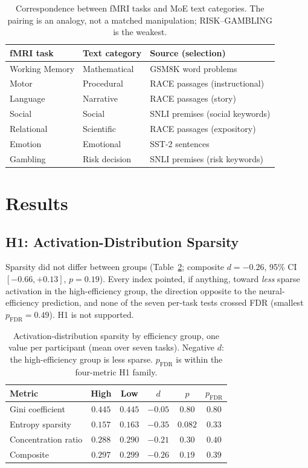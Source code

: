 \documentclass[conference]{IEEEtran}
\begin{document}
\begin{table}[t]
\caption{Correspondence between fMRI tasks and MoE text categories. The pairing is an analogy, not a matched manipulation; RISK--GAMBLING is the weakest.}
\label{tab:mapping}
\centering
\footnotesize
\setlength{\tabcolsep}{3pt}
\begin{tabular}{@{}lll@{}}
\toprule
\textbf{fMRI task} & \textbf{Text category} & \textbf{Source (selection)} \\
\midrule
Working Memory & Mathematical & GSM8K word problems \\
Motor & Procedural & RACE passages (instructional) \\
Language & Narrative & RACE passages (story) \\
Social & Social & SNLI premises (social keywords) \\
Relational & Scientific & RACE passages (expository) \\
Emotion & Emotional & SST-2 sentences \\
Gambling & Risk decision & SNLI premises (risk keywords) \\
\bottomrule
\end{tabular}
\end{table}

\section{Results}

\subsection{H1: Activation-Distribution Sparsity}

Sparsity did not differ between groups (Table~\ref{tab:sparsity}; composite $d = -0.26$, 95\% CI $[-0.66, +0.13]$, $p = 0.19$). Every index pointed, if anything, toward \emph{less} sparse activation in the high-efficiency group, the direction opposite to the neural-efficiency prediction, and none of the seven per-task tests crossed FDR (smallest $p_{\text{FDR}} = 0.49$). H1 is not supported.

\begin{table}[t]
\caption{Activation-distribution sparsity by efficiency group, one value per participant (mean over seven tasks). Negative $d$: the high-efficiency group is less sparse. $p_{\text{FDR}}$ is within the four-metric H1 family.}
\label{tab:sparsity}
\centering
\footnotesize
\setlength{\tabcolsep}{4pt}
\begin{tabular}{lccccc}
\toprule
\textbf{Metric} & \textbf{High} & \textbf{Low} & $d$ & $p$ & $p_{\text{FDR}}$ \\
\midrule
Gini coefficient    & $0.445$ & $0.445$ & $-0.05$ & $0.80$ & $0.80$ \\
Entropy sparsity    & $0.157$ & $0.163$ & $-0.35$ & $0.082$ & $0.33$ \\
Concentration ratio & $0.288$ & $0.290$ & $-0.21$ & $0.30$ & $0.40$ \\
Composite           & $0.297$ & $0.299$ & $-0.26$ & $0.19$ & $0.39$ \\
\bottomrule
\end{tabular}
\end{table}
\end{document}
